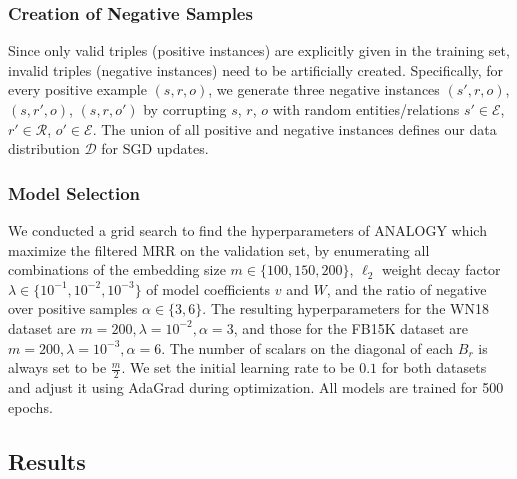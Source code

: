 \documentclass{article}
\begin{document}
\subsubsection{Creation of Negative Samples}
Since only valid triples (positive instances) are explicitly given in the training set,
invalid triples (negative instances) need to be artificially created.
Specifically,
for every positive example $(s, r, o)$,
we generate three negative instances $(s', r, o)$, $(s, r', o)$, $(s, r, o')$ by corrupting $s$, $r$, $o$ with random entities/relations $s' \in \mathcal{E}$, $r' \in \mathcal{R}$, $o' \in \mathcal{E}$.
The union of all positive and negative instances
defines our data distribution $\mathcal{D}$ for SGD updates.

\subsubsection{Model Selection}
We conducted a grid search to find the hyperparameters of ANALOGY which maximize the filtered MRR on the validation set,
by enumerating all combinations of the embedding size $m \in \{100, 150, 200\}$,
$\ell_2$ weight decay factor $\lambda \in \{10^{-1}, 10^{-2}, 10^{-3}\}$ of model coefficients $v$ and $W$,
and the ratio of negative over positive samples $\alpha \in \{3, 6\}$.
The resulting hyperparameters for the WN18 dataset are $m = 200, \lambda = 10^{-2}, \alpha = 3$,
and those for the FB15K dataset are $m = 200, \lambda = 10^{-3}, \alpha = 6$.
The number of scalars on the diagonal of each $B_r$ is always set to be $\frac{m}{2}$.
We set the initial learning rate to be $0.1$ for both datasets and adjust it using AdaGrad during optimization.
All models are trained for 500 epochs.

\subsection{Results}
\end{document}
